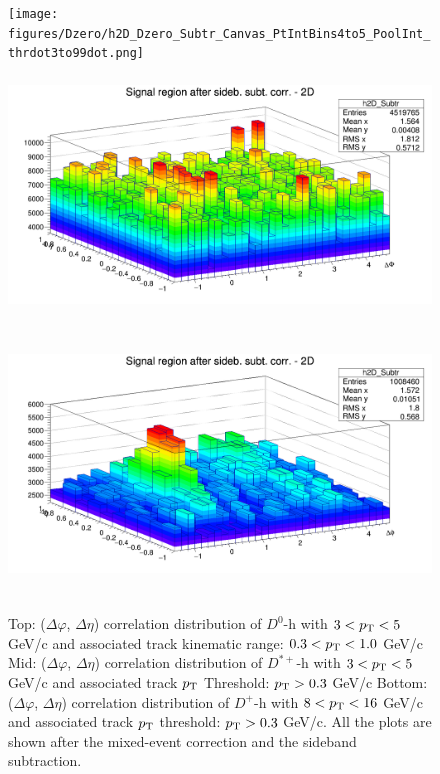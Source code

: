 \begin{figure}
\centering
{\texttt{[image: figures/Dzero/h2D\_Dzero\_Subtr\_Canvas\_PtIntBins4to5\_PoolInt\_thrdot3to99dot.png]}}
{\includegraphics[width=0.9\linewidth, height = 7cm]{figures/Dstar_wEFF/h2D_Dstar_Subtr_Canvas_PtIntBins2to3_PoolInt_thr0dot3to99dot0.png}}
{\includegraphics[width=0.9\linewidth, height = 7cm]{figures/DplusPlotsweff/h2D_Dplus_Subtr_Canvas_PtIntBins8to10_PoolInt_thr0dot3to99dot0.png}}
\caption{Top: ($\Delta\varphi$, $\Delta\eta$) correlation distribution of $D^{0}$-h with $3 < p_{\rm T} < 5$ GeV/c and associated track kinematic range: $0.3 < p_{\rm T} < 1.0$ GeV/c
Mid: ($\Delta\varphi$, $\Delta\eta$) correlation distribution of $D^{*+}$-h with $3 < p_{\rm T} < 5$ GeV/c and associated track $p_{\rm T}$ Threshold: $p_{\rm T} > 0.3$ GeV/c
Bottom: ($\Delta\varphi$, $\Delta\eta$) correlation distribution of $D^{+}$-h with $8 < p_{\rm T} < 16$ GeV/c and associated track $p_{\rm T}$ threshold: $p_{\rm T} > 0.3$ GeV/c. All the plots are shown after the mixed-event correction and the sideband subtraction.}
\label{fig:Dsubtr2D}

\end{figure}
\clearpage
%

